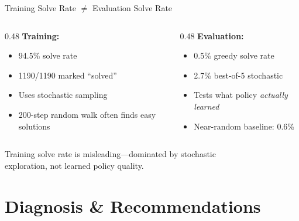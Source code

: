 \documentclass[aspectratio=169,11pt]{beamer}
\begin{document}
\begin{frame}{Training Solve Rate $\neq$ Evaluation Solve Rate}
  \begin{columns}[T]
    \begin{column}{0.48\textwidth}
      \textbf{Training:}
      \begin{itemize}
        \item 94.5\% solve rate
        \item 1190/1190 marked ``solved''
        \item Uses stochastic sampling
        \item 200-step random walk often finds easy solutions
      \end{itemize}
    \end{column}
    \begin{column}{0.48\textwidth}
      \textbf{Evaluation:}
      \begin{itemize}
        \item 0.5\% greedy solve rate
        \item 2.7\% best-of-5 stochastic
        \item Tests what policy \textit{actually learned}
        \item Near-random baseline: 0.6\%
      \end{itemize}
    \end{column}
  \end{columns}

  \bigskip
  \begin{center}
    \alert{Training solve rate is misleading}---dominated by stochastic\\
    exploration, not learned policy quality.
  \end{center}
\end{frame}

\section{Diagnosis \& Recommendations}
\end{document}
